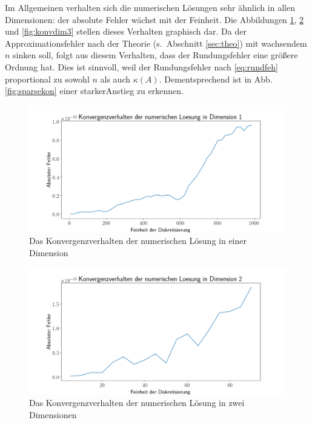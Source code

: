 \documentclass[smallheadings]{scrartcl}
\numberwithin{equation}{section}
\begin{document}
Im Allgemeinen verhalten sich die numerischen Lösungen sehr ähnlich in allen Dimensionen: der absolute Fehler wächst mit der Feinheit. Die Abbildungen \ref{fig:konvdim1}, \ref{fig:konvdim2} und \ref{fig:konvdim3} stellen dieses Verhalten graphisch dar. Da der Approximationsfehler nach der Theorie (s.~Abschnitt \ref{sec:theo}) mit wachsendem $n$ sinken soll, folgt aus diesem Verhalten, dass der Rundungsfehler eine größere Ordnung hat. Dies ist sinnvoll, weil der Rundungsfehler nach \ref{eq:rundfeh} proportional zu sowohl  $n$ als auch $\kappa(A)$. Dementsprechend ist in Abb. \ref{fig:sparsekon} einer starkerAnstieg zu erkennen.

\begin{figure}[H]
	\centering
	\includegraphics[width=\linewidth]{Bericht/Bilder2/konvdim1}
	\caption{Das Konvergenzverhalten der numerischen Lösung in einer Dimension}
	\label{fig:konvdim1}
\end{figure}

\begin{figure}[H]
	\centering
	\includegraphics[width=\linewidth]{Bericht/Bilder2/konvdim2}
	\caption{Das Konvergenzverhalten der numerischen Lösung in zwei Dimensionen}
	\label{fig:konvdim2}
\end{figure}
\end{document}
